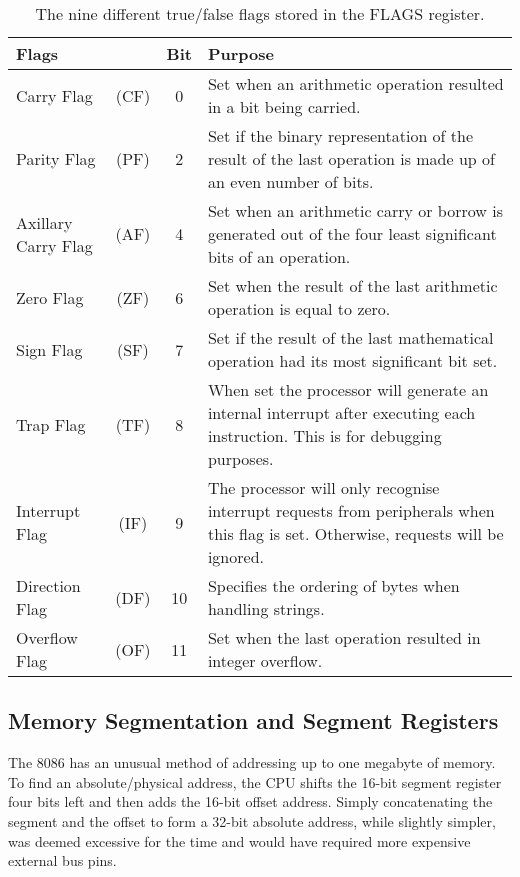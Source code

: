     \begin{table}[h]
        \centering
        \begin{tabular} { | l c | c | m{} | }
            \hline
            Flags & & Bit & Purpose \\
            \hline
            Carry Flag              & (CF) &  0 & Set when an arithmetic operation resulted in a bit being carried. \\
            Parity Flag             & (PF) &  2 & Set if the binary representation of the result of the last operation is made up of an even number of bits. \\
            Axillary Carry Flag     & (AF) &  4 & Set when an arithmetic carry or borrow is generated out of the four least significant bits of an operation. \\
            Zero Flag               & (ZF) &  6 & Set when the result of the last arithmetic operation is equal to zero. \\
            Sign Flag               & (SF) &  7 & Set if the result of the last mathematical operation had its most significant bit set. \\
            Trap Flag               & (TF) &  8 & When set the processor will generate an internal interrupt after executing each instruction. This is for debugging purposes. \\
            Interrupt Flag          & (IF) &  9 & The processor will only recognise interrupt requests from peripherals when this flag is set. Otherwise, requests will be ignored. \\
            Direction Flag          & (DF) & 10 & Specifies the ordering of bytes when handling strings. \\
            Overflow Flag           & (OF) & 11 & Set when the last operation resulted in integer overflow. \\
            \hline
        \end{tabular}
        \caption{The nine different true/false flags stored in the FLAGS register.}
        \label{table:flags}
    \end{table}

\subsection{Memory Segmentation and Segment Registers}
    The 8086 has an unusual method of addressing up to one megabyte of memory. To find an absolute/physical address, the CPU shifts the 16-bit segment register four bits left and then adds the 16-bit offset address. Simply concatenating the segment and the offset to form a 32-bit absolute address, while slightly simpler, was deemed excessive for the time and would have required more expensive external bus pins.

